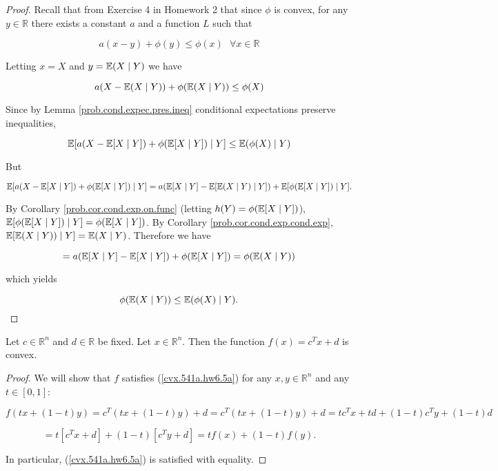 \begin{proof} 


Recall that from Exercise 4 in Homework 2 that since \(\phi\) is convex, for any \(y \in \mathbb{R}\) there exists a constant \(a\) and a function \(L\) such that

\[
a(x-y)+\phi(y) \leq \phi(x) \ \ \ \forall x \in \mathbb{R}
\]

Letting \(x = X\) and \(y = \mathbb{E}(X \mid Y)\) we have

\[
a (X-\mathbb{E} (X \mid Y))+\phi(\mathbb{E} ( X \mid Y)) \leq \phi(X)
\]


Since by Lemma \ref{prob.cond.expec.pres.ineq} conditional expectations preserve inequalities,

\[
\mathbb{E}[a (X-\mathbb{E} [X \mid Y])+\phi(\mathbb{E} [X \mid Y]) \mid Y ] \leq \mathbb{E} ( \phi(X) \mid Y)
\]

But

\[
\mathbb{E}[a (X-\mathbb{E} [X \mid Y])+\phi(\mathbb{E} [X \mid Y]) \mid Y ]  = a(\mathbb{E} [X \mid Y] -  \mathbb{E}[ \mathbb{E} (X \mid Y) \mid Y] ) + \mathbb{E}[\phi(\mathbb{E} [X \mid Y]) \mid Y].
\]

By Corollary \ref{prob.cor.cond.exp.on.func} (letting \(h(Y) = \phi(\mathbb{E} [X \mid Y])\)), \( \mathbb{E}[\phi(\mathbb{E} [X \mid Y]) \mid Y] = \phi(\mathbb{E} [X \mid Y])\). By Corollary \ref{prob.cor.cond.exp.cond.exp}, \( \mathbb{E}[ \mathbb{E} (X \mid Y)) \mid Y] = \mathbb{E}(X \mid Y)\). Therefore we have

\[
 = a(\mathbb{E} [X \mid Y] - \mathbb{E} [X \mid Y]) + \phi(\mathbb{E} [X \mid Y]) = \phi(\mathbb{E} (X \mid Y))
\]

which yields

\[
\phi( \mathbb{E} (X \mid Y)) \leq \mathbb{E}( \phi(X) \mid Y).
\]


\end{proof}







\begin{proposition}\label{cvx.affine.cvx}

Let $c \in \mathbb{R}^n$ and \(d \in \mathbb{R}\) be fixed. Let \(x \in \mathbb{R}^n\). Then the function \( f(x) = c^Tx + d\) is convex.

\end{proposition}

\begin{proof} We will show that \(f\) satisfies (\ref{cvx.541a.hw6.5a}) for any \(x,y \in \mathbb{R}^n\) and any \(t \in [0,1]\):

\[
f(tx+(1-t)y) =  c^T(tx+(1-t)y) + d =  c^T(tx+(1-t)y) + d  = t c^Tx+ td +(1-t) c^Ty  + (1-t)d
\]

\[
= t[c^Tx + d] +(1-t)[c^Ty + d] = tf(x)+(1-t)f(y).
\]

In particular, (\ref{cvx.541a.hw6.5a}) is satisfied with equality.

\end{proof}

